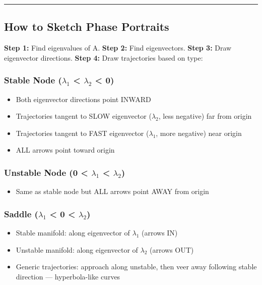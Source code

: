 \documentclass[12pt,a4paper,openany]{book}
\begin{document}
{{\bigskip\noindent\rule{\textwidth}{0.4pt}\bigskip


\subsection{How to Sketch Phase Portraits}

\textbf{Step 1:} Find eigenvalues of A.
\textbf{Step 2:} Find eigenvectors.
\textbf{Step 3:} Draw eigenvector directions.
\textbf{Step 4:} Draw trajectories based on type:

\subsubsection{Stable Node ($\lambda_1$ < $\lambda_2$ < 0)}
\begin{itemize}[leftmargin=*]
  \item Both eigenvector directions point INWARD
  \item Trajectories tangent to SLOW eigenvector ($\lambda_2$, less negative) far from origin
  \item Trajectories tangent to FAST eigenvector ($\lambda_1$, more negative) near origin
  \item ALL arrows point toward origin
\end{itemize}

\subsubsection{Unstable Node (0 < $\lambda_1$ < $\lambda_2$)}
\begin{itemize}[leftmargin=*]
  \item Same as stable node but ALL arrows point AWAY from origin
\end{itemize}

\subsubsection{Saddle ($\lambda_1$ < 0 < $\lambda_2$)}
\begin{itemize}[leftmargin=*]
  \item Stable manifold: along eigenvector of $\lambda_1$ (arrows IN)
  \item Unstable manifold: along eigenvector of $\lambda_2$ (arrows OUT)
  \item Generic trajectories: approach along unstable, then veer away following stable direction — hyperbola-like curves
\end{itemize}

}}
\end{document}

